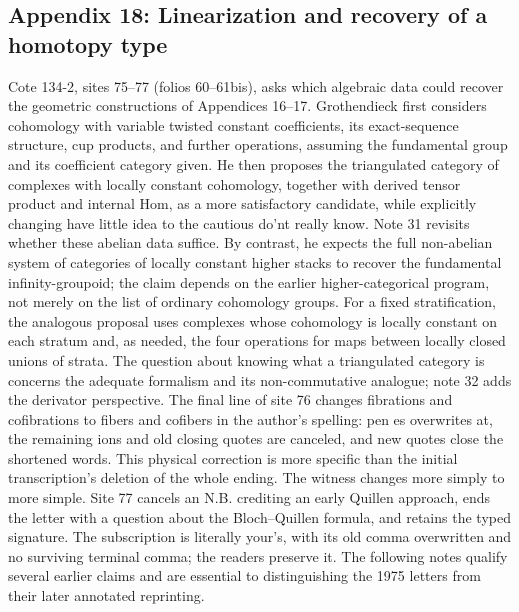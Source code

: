 \documentclass[10pt,oneside]{book}
\begin{document}
\subsection*{Appendix 18: Linearization and recovery of a homotopy type}
Cote 134-2, sites 75--77 (folios 60--61bis), asks which algebraic data could recover the geometric constructions of Appendices 16--17. Grothendieck first considers cohomology with variable twisted constant coefficients, its exact-sequence structure, cup products, and further operations, assuming the fundamental group and its coefficient category given. He then proposes the triangulated category of complexes with locally constant cohomology, together with derived tensor product and internal Hom, as a more satisfactory candidate, while explicitly changing have little idea to the cautious do'nt really know. Note 31 revisits whether these abelian data suffice. By contrast, he expects the full non-abelian system of categories of locally constant higher stacks to recover the fundamental infinity-groupoid; the claim depends on the earlier higher-categorical program, not merely on the list of ordinary cohomology groups. For a fixed stratification, the analogous proposal uses complexes whose cohomology is locally constant on each stratum and, as needed, the four operations for maps between locally closed unions of strata. The question about knowing what a triangulated category is concerns the adequate formalism and its non-commutative analogue; note 32 adds the derivator perspective. The final line of site 76 changes fibrations and cofibrations to fibers and cofibers in the author's spelling: pen es overwrites at, the remaining ions and old closing quotes are canceled, and new quotes close the shortened words. This physical correction is more specific than the initial transcription's deletion of the whole ending. The witness changes more simply to more simple. Site 77 cancels an N.B. crediting an early Quillen approach, ends the letter with a question about the Bloch--Quillen formula, and retains the typed signature. The subscription is literally your's, with its old comma overwritten and no surviving terminal comma; the readers preserve it. The following notes qualify several earlier claims and are essential to distinguishing the 1975 letters from their later annotated reprinting.
\end{document}
